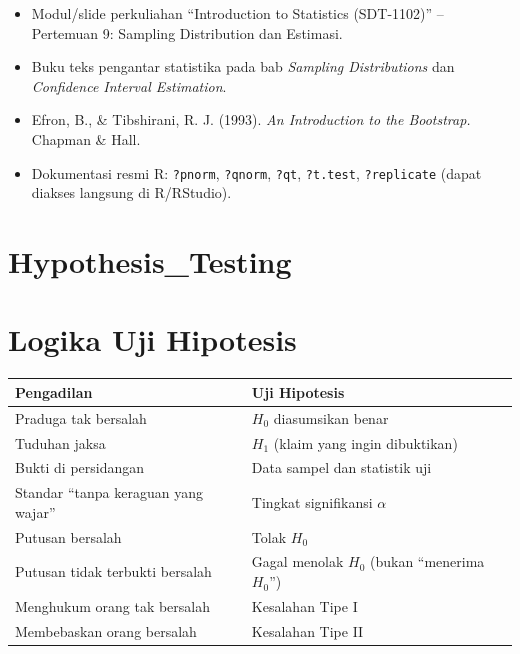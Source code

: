 \documentclass[
  indonesian,
  letterpaper,
]{book}
\newcounter{none} %
\providecommand{\tightlist}{%
  \setlength{\itemsep}{0pt}\setlength{\parskip}{0pt}}
\begin{document}
\begin{itemize}
\tightlist
\item
  Modul/slide perkuliahan ``Introduction to Statistics (SDT-1102)'' --
  Pertemuan 9: Sampling Distribution dan Estimasi.
\item
  Buku teks pengantar statistika pada bab \emph{Sampling Distributions}
  dan \emph{Confidence Interval Estimation}.
\item
  Efron, B., \& Tibshirani, R. J. (1993). \emph{An Introduction to the
  Bootstrap.} Chapman \& Hall.
\item
  Dokumentasi resmi R: \texttt{?pnorm}, \texttt{?qnorm}, \texttt{?qt},
  \texttt{?t.test}, \texttt{?replicate} (dapat diakses langsung di
  R/RStudio).
\end{itemize}


\chapter{Hypothesis\_Testing}\label{hypothesis_testing}

\setcounter{section}{1}


\chapter{Logika Uji Hipotesis}\label{logika-uji-hipotesis}

{\def\LTcaptype{none} %
\begin{longtable}[]{@{}
  >{\raggedright\arraybackslash}p{}
  >{\raggedright\arraybackslash}p{}@{}}
\toprule\noalign{}
\begin{minipage}[b]{\linewidth}\raggedright
Pengadilan
\end{minipage} & \begin{minipage}[b]{\linewidth}\raggedright
Uji Hipotesis
\end{minipage} \\
\midrule\noalign{}
\endhead
\bottomrule\noalign{}
\endlastfoot
Praduga tak bersalah & \(H_0\) diasumsikan benar \\
Tuduhan jaksa & \(H_1\) (klaim yang ingin dibuktikan) \\
Bukti di persidangan & Data sampel dan statistik uji \\
Standar ``tanpa keraguan yang wajar'' & Tingkat signifikansi
\(\alpha\) \\
Putusan bersalah & Tolak \(H_0\) \\
Putusan tidak terbukti bersalah & Gagal menolak \(H_0\) (bukan
``menerima \(H_0\)'') \\
Menghukum orang tak bersalah & Kesalahan Tipe I \\
Membebaskan orang bersalah & Kesalahan Tipe II \\
\end{longtable}
}
\end{document}
